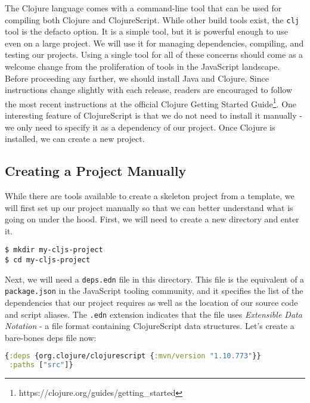 \documentclass[10pt,twoside,openright]{memoir}
\begin{document}
The Clojure language comes with a command-line tool that can be used for
compiling both Clojure and ClojureScript. While other build tools exist,
the \texttt{clj} tool is the defacto option. It is a simple tool, but it
is powerful enough to use even on a large project. We will use it for
managing dependencies, compiling, and testing our projects. Using a
single tool for all of these concerns should come as a welcome change
from the proliferation of tools in the JavaScript landscape. Before
proceeding any farther, we should install Java and Clojure. Since
instructions change slightly with each release, readers are encouraged
to follow the most recent instructions at the official
Clojure Getting Started Guide\footnote{https://clojure.org/guides/getting\_started}. One interesting feature of ClojureScript is that we do
not need to install it manually - we only need to specify it as a
dependency of our project. Once Clojure is installed, we can create a
new project.

\subsection{Creating a Project Manually}

While there are tools available to create a skeleton project from a
template, we will first set up our project manually so that we can
better understand what is going on under the hood. First, we will need
to create a new directory and enter it.

\begin{verbatim}
$ mkdir my-cljs-project
$ cd my-cljs-project
\end{verbatim}

Next, we will need a \texttt{deps.edn} file in this directory. This file
is the equivalent of a \texttt{package.json} in the JavaScript tooling
community, and it specifies the list of the dependencies that our
project requires as well as the location of our source code and script
aliases. The \texttt{.edn} extension indicates that the file uses
\emph{Extensible Data Notation} - a file format containing ClojureScript
data structures. Let's create a bare-bones deps file now:

\begin{lstlisting}[language=Clojure, caption={deps.edn}]
{:deps {org.clojure/clojurescript {:mvn/version "1.10.773"}}
 :paths ["src"]}
\end{lstlisting}
\end{document}
